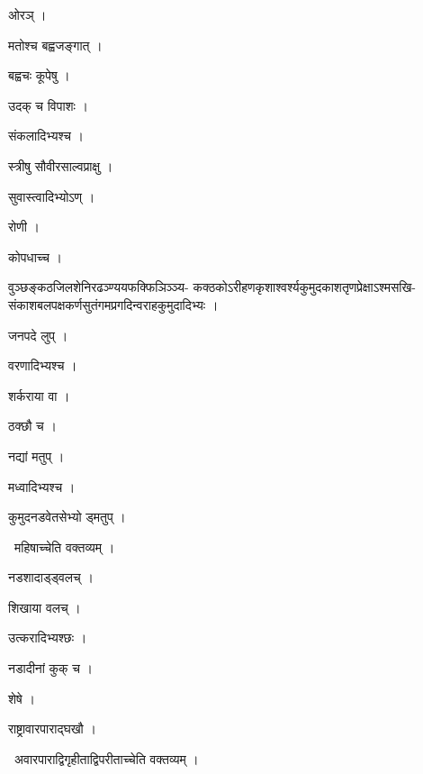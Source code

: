\documentclass[10pt, openany, oneside]{book}
\begin{document}
\noindent ओरञ् ।

\noindent मतोश्च बह्वजङ्गात् ।

\noindent बह्वचः कूपेषु ।

\noindent उदक् च विपाशः ।

\noindent संकलादिभ्यश्च ।

\noindent स्त्रीषु सौवीरसाल्वप्राक्षु ।

\noindent सुवास्त्वादिभ्योऽण् ।

\noindent रोणी ।

\noindent कोपधाच्च ।

\noindent वुञ्छङ्कठजिलशेनिरढञ्ण्ययफक्फिञिञ्ञ्य- कक्ठकोऽरीहणकृशाश्वर्श्यकुमुदकाशतृणप्रेक्षाऽश्मसखि- संकाशबलपक्षकर्णसुतंगमप्रगदिन्वराहकुमुदादिभ्यः ।

\noindent जनपदे लुप् ।

\noindent वरणादिभ्यश्च ।

\noindent शर्कराया वा ।

\noindent ठक्छौ च ।

\noindent नद्यां मतुप् ।

\noindent मध्वादिभ्यश्च ।

\noindent कुमुदनडवेतसेभ्यो ड्मतुप् ।

\par\noindent\hspace{1.5em}{\vps वा॰}~{\qt महिषाच्चेति वक्तव्यम् ।}

\noindent नडशादाड्ड्वलच् ।

\noindent शिखाया वलच् ।

\noindent उत्करादिभ्यश्छः ।

\noindent नडादीनां कुक् च ।

\noindent शेषे ।

\noindent राष्ट्रावारपाराद्घखौ ।

\par\noindent\hspace{1.5em}{\vps वा॰}~{\qt अवारपाराद्विगृहीताद्विपरीताच्चेति वक्तव्यम् ।}
\end{document}
